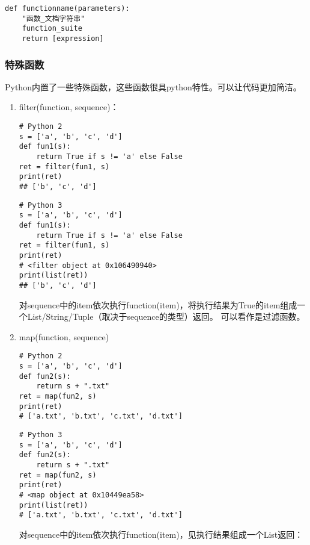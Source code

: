 \begin{verbatim}
def functionname(parameters):
    "函数_文档字符串"
    function_suite
    return [expression]
\end{verbatim}

\subsubsection{特殊函数}

Python内置了一些特殊函数，这些函数很具python特性。可以让代码更加简洁。

\begin{enumerate}
\item filter(function, sequence)：
\begin{verbatim}
# Python 2
s = ['a', 'b', 'c', 'd']
def fun1(s):
    return True if s != 'a' else False
ret = filter(fun1, s)
print(ret)
## ['b', 'c', 'd']
\end{verbatim}

\begin{verbatim}
# Python 3
s = ['a', 'b', 'c', 'd']
def fun1(s):
    return True if s != 'a' else False
ret = filter(fun1, s)
print(ret)
# <filter object at 0x106490940>
print(list(ret))
## ['b', 'c', 'd']
\end{verbatim}

对sequence中的item依次执行function(item)，将执行结果为True的item组成一个List/String/Tuple（取决于sequence的类型）返回。
可以看作是过滤函数。

\item map(function, sequence) 
\begin{verbatim}
# Python 2
s = ['a', 'b', 'c', 'd'] 
def fun2(s):
    return s + ".txt"
ret = map(fun2, s)
print(ret)
# ['a.txt', 'b.txt', 'c.txt', 'd.txt']
\end{verbatim}

\begin{verbatim}
# Python 3
s = ['a', 'b', 'c', 'd'] 
def fun2(s):
    return s + ".txt"
ret = map(fun2, s)
print(ret)
# <map object at 0x10449ea58>
print(list(ret))
# ['a.txt', 'b.txt', 'c.txt', 'd.txt']
\end{verbatim}

对sequence中的item依次执行function(item)，见执行结果组成一个List返回：


\end{enumerate}
